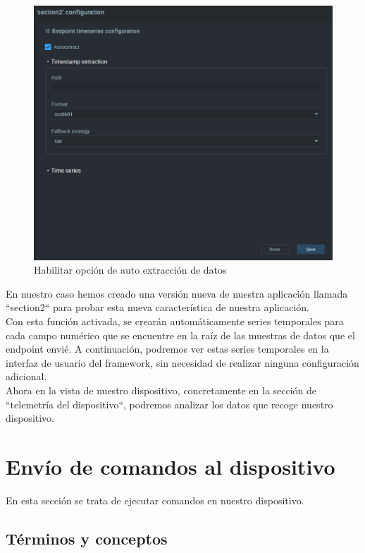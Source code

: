{\begin{figure}[hb!]
    \centering
    \includegraphics[width=\linewidth]{imagenes/autoextract-option.png}
    \caption{Habilitar opción de auto extracción de datos}
    \label{fig:figure10}
\end{figure}

En nuestro caso hemos creado una versión nueva de nuestra aplicación llamada ``section2`` para probar esta nueva característica de nuestra aplicación. \\

Con esta función activada, se crearán automáticamente series temporales para cada campo numérico que se encuentre en la raíz de las muestras de datos que el endpoint envié. A continuación, podremos ver estas series temporales en la interfaz de usuario del framework, sin necesidad de realizar ninguna configuración adicional. \\

Ahora en la vista de nuestro dispositivo, concretamente en la sección de ``telemetría del dispositivo``, podremos analizar los datos que recoge nuestro dispositivo.

\section{Envío de comandos al dispositivo}

En esta sección se trata de ejecutar comandos en nuestro dispositivo.

\subsection{Términos y conceptos}

}
